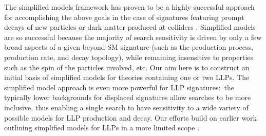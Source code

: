 
The simplified models framework has proven to be a highly successful approach for accomplishing the above goals in the case of signatures featuring prompt decays of new particles \cite{Alves:2011wf} or dark matter produced at colliders \cite{Abdallah:2015ter}.  Simplified models are so successful because the majority of search sensitivity is driven by only a few broad aspects of a given beyond-SM signature (such as the production process, production rate, and decay topology), while remaining insensitive to properties such as the spin of the particles involved, etc.  Our aim here is to construct an initial basis of simplified models for theories containing one or two LLPs.  The simplified model approach is even more powerful for LLP signatures:~the typically lower backgrounds for displaced signatures allow searches to be more inclusive, thus enabling a single search to have sensitivity to a wide variety of possible models for LLP production and decay. Our efforts build on earlier work outlining simplified models for LLPs in a more limited scope \cite{Liu:2015bma,Khoze:2017ixx,Buchmueller:2017uqu}. 

